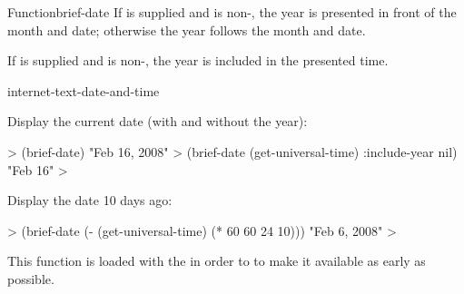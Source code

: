 \documentclass[10pt,twoside,english,pdftex]{article}
\begin{document}
\begin{functiondoc}{Function}{brief-date}
\W{} 
%
If  is supplied and is non-\nil, the year is presented in
front of the month and date; otherwise the year follows the month and date.

\W{} 
%
If  is supplied and is non-\nil, the year is included in
the presented time.

\begin{alsos}{internet-text-date-and-time}
\end{alsos}

\fnexamples
Display the current date (with and without the year):
%
\W\supp
\begin{example}
  > (brief-date)
  "Feb 16, 2008"
  > (brief-date (get-universal-time) :include-year nil)
  "Feb 16"
  >
\end{example}
%
Display the date 10 days ago:
%
\W\supp\notpretop
\begin{example}
  > (brief-date (- (get-universal-time) (* 60 60 24 10)))
  "Feb 6, 2008"
  >
\end{example}

\fnnote
{}%
%
%
This function is loaded with the  
in order to to make it available as early as possible.

\end{functiondoc}

\end{document}
